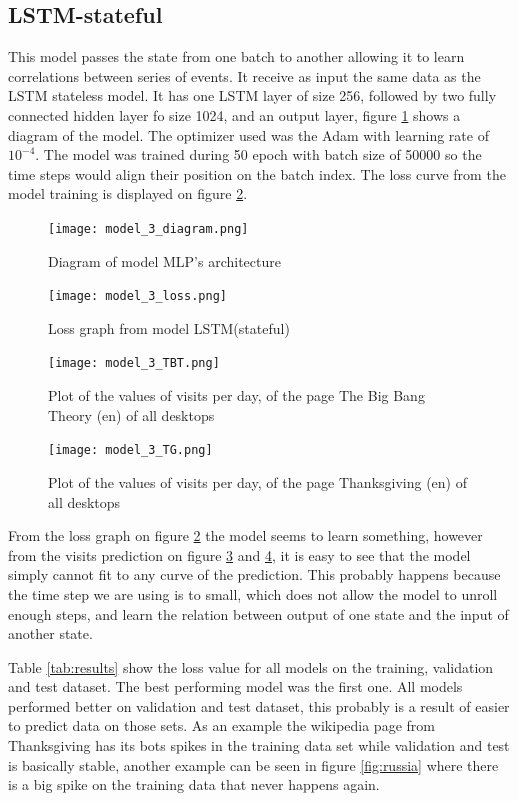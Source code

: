 \subsection{LSTM-stateful}

This model passes the state from one batch to another allowing it to learn correlations between series of events.
It receive as input the same data as the LSTM stateless model.
It has one LSTM layer of size 256, followed by two fully connected hidden layer fo size 1024,
and an output layer, figure \ref{fig:mode_3_diagram} shows a diagram of the model.
The optimizer used was the Adam with learning rate of $10^{-4}$.
The model was trained during 50 epoch with batch size of 50000 so the time steps would align their position on the batch index.
The loss curve from the model training is displayed on figure \ref{fig:model_3_loss}.

\begin{figure}
	\centering
	\texttt{[image: model\_3\_diagram.png]}
	\caption{Diagram of model MLP's architecture\label{fig:mode_3_diagram}}
\end{figure}

\begin{figure}
	\centering
	\texttt{[image: model\_3\_loss.png]}
	\caption{Loss graph from model LSTM(stateful)\label{fig:model_3_loss}}
\end{figure}

\begin{figure}
	\centering
	\texttt{[image: model\_3\_TBT.png]}
	\caption{Plot of the values of visits per day, of the page The Big Bang Theory (en) of all desktops\label{fig:model_3_TBT}}
\end{figure}

\begin{figure}
	\centering
	\texttt{[image: model\_3\_TG.png]}
	\caption{Plot of the values of visits per day, of the page Thanksgiving (en) of all desktops\label{fig:model_3_TG}}
\end{figure}

From the loss graph on figure \ref{fig:model_3_loss} the model seems to learn something,
however from the visits prediction on figure \ref{fig:model_3_TBT} and \ref{fig:model_3_TG},
it is easy to see that the model simply cannot fit to any curve of the prediction.
This probably happens because the time step we are using is to small, which does not allow the model to unroll enough steps,
and learn the relation between output of one state and the input of another state.

Table \ref{tab:results} show the loss value for all models on the training, validation and test dataset. The best performing model was the first one. All models performed better on validation and test dataset, this probably is a result of easier to predict data on those sets. As an example the wikipedia page from Thanksgiving has its bots spikes in the training data set while validation and test is basically stable, another example can be seen in figure \ref{fig:russia} where there is a big spike on the training data that never happens again.


